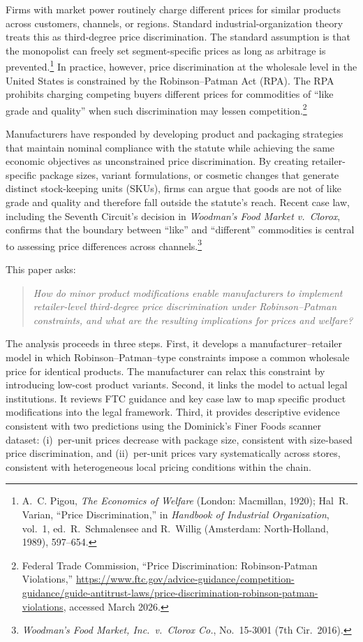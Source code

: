 \documentclass[12pt]{article}
\theoremstyle{definition}
\begin{document}
Firms with market power routinely charge different prices for similar products across customers, channels, or regions.
Standard industrial-organization theory treats this as third-degree price discrimination. The standard assumption is that the monopolist can freely set segment-specific prices as long as arbitrage is prevented.\footnote{A.~C. Pigou, \textit{The Economics of Welfare} (London: Macmillan, 1920); Hal~R. Varian, ``Price Discrimination,'' in \textit{Handbook of Industrial Organization}, vol.~1, ed.\ R.~Schmalensee and R.~Willig (Amsterdam: North-Holland, 1989), 597--654.}
In practice, however, price discrimination at the wholesale level in the United States is constrained by the Robinson--Patman Act (RPA). The RPA prohibits charging competing buyers different prices for commodities of ``like grade and quality'' when such discrimination may lessen competition.\footnote{Federal Trade Commission, ``Price Discrimination: Robinson-Patman Violations,'' \url{https://www.ftc.gov/advice-guidance/competition-guidance/guide-antitrust-laws/price-discrimination-robinson-patman-violations}, accessed March 2026.}

Manufacturers have responded by developing product and packaging strategies that maintain nominal compliance with the statute while achieving the same economic objectives as unconstrained price discrimination.
By creating retailer-specific package sizes, variant formulations, or cosmetic changes that generate distinct stock-keeping units (SKUs), firms can argue that goods are not of like grade and quality and therefore fall outside the statute's reach.
Recent case law, including the Seventh Circuit's decision in \textit{Woodman's Food Market v.\ Clorox}, confirms that the boundary between ``like'' and ``different'' commodities is central to assessing price differences across channels.\footnote{\textit{Woodman's Food Market, Inc.\ v.\ Clorox Co.}, No.\ 15-3001 (7th Cir.\ 2016).}

This paper asks:
\begin{quote}
\textit{How do minor product modifications enable manufacturers to implement retailer-level third-degree price discrimination under Robinson--Patman constraints, and what are the resulting implications for prices and welfare?}
\end{quote}

The analysis proceeds in three steps.
First, it develops a manufacturer--retailer model in which Robinson--Patman--type constraints impose a common wholesale price for identical products. The manufacturer can relax this constraint by introducing low-cost product variants.
Second, it links the model to actual legal institutions. It reviews FTC guidance and key case law to map specific product modifications into the legal framework.
Third, it provides descriptive evidence consistent with two predictions using the Dominick's Finer Foods scanner dataset: (i)~per-unit prices decrease with package size, consistent with size-based price discrimination, and (ii)~per-unit prices vary systematically across stores, consistent with heterogeneous local pricing conditions within the chain.
\end{document}

